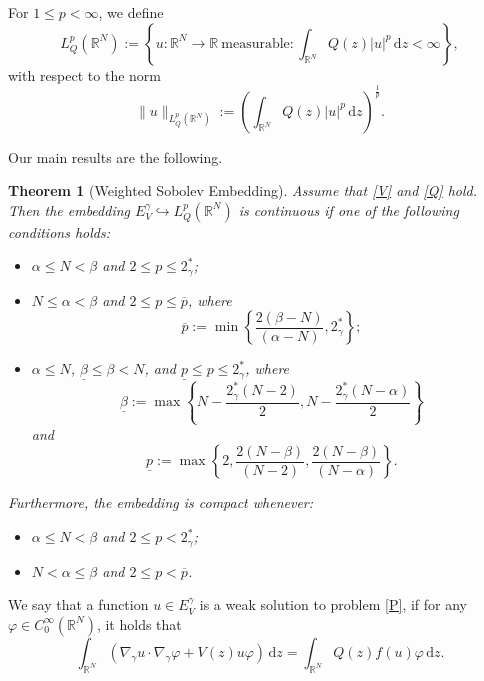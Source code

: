 \documentclass[12pt]{amsart}
\newtheorem{theorem}{Theorem}[section]
\begin{document}
For $1\leq p<\infty$, we define
$$
L^p_Q(\mathbb{R}^N):=\left\lbrace u:\mathbb{R}^N \to \mathbb{R} \   \mbox{measurable} : \int_{\mathbb{R}^N}Q(z)|u|^p\,\mathrm{d}z<\infty \right\rbrace, 
$$
with respect to the norm
$$
\|u\|_{L^p_Q(\mathbb{R}^N)}:=\left(\int_{\mathbb{R}^N}Q(z)|u|^p\,\mathrm{d}z\right)^{\frac{1}{p}}. 
$$




Our main results are the following.


\begin{theorem}[Weighted Sobolev Embedding]
	\label{imersao} Assume that \ref{V} and \ref{Q} hold. Then the embedding $E_V^\gamma \hookrightarrow L^p_Q(\mathbb{R}^N)$ is continuous  if one of the following conditions holds: 	
	\begin{itemize}
		\item [(i)] $\alpha \leq  N < \beta$ and $2\leq p \leq 2_\gamma^*$;
		
		\item[(ii)] $N
        \leq\alpha < \beta$ and $2\leq p \leq \overline{p}$,
		where
		$$
		\overline{p}:=\min\left\lbrace \frac{2(\beta-N)}{(\alpha-N)},2_\gamma^* \right\rbrace;
		$$
		
		\item [(iii)] $\alpha\leq N$, $ \underline{\beta} \leq \beta <N$, and $\underline{p}\leq p\leq2_\gamma^*$,
		where
		$$
		\underline{\beta}:=\max\left\lbrace N-\frac{2_\gamma^*(N-2)}{2},N-\frac{2_\gamma^*(N-\alpha)}{2}\right\rbrace 
		$$
		and
		$$
		\underline{p}:=\max\left\lbrace 2, \frac{2(N-\beta)}{(N-2)}, \frac{2(N-\beta)}{(N-\alpha)} \right\rbrace.
		$$
		
		
	\end{itemize}
	Furthermore, the embedding is compact whenever:
	\begin{itemize}
		\item [(i')] $\alpha \leq  N < \beta$ and $2\leq p < 2_\gamma^*$;
		
		\item[(ii')] $N<\alpha\leq\beta$ and $2\leq p < \overline{p}$.
		
		
	\end{itemize}
\end{theorem}



We say that a function $u\in E_V^\gamma$ is a weak solution to problem \eqref{P}, if for any $\varphi \in C_0^\infty(\mathbb{R}^N)$, it holds that
$$
\int_{\mathbb{R}^N}\left(\nabla_\gamma u \cdot \nabla_\gamma \varphi + V(z)u\varphi\right)\,\mathrm{d}z = \int_{\mathbb{R}^N}Q(z)f(u)\varphi\,\mathrm{d}z.
$$
\end{document}
